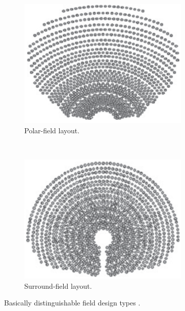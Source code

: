 \begin{figure}[!htbp]
        \centering
        \begin{subfigure}[b]{0.5\textwidth}
                \centering
                \includegraphics[width=0.9\textwidth]{FIG/north_field_layout}
                \caption{Polar-field layout.}\label{north_field_layout}
        \end{subfigure}%
        ~
        \begin{subfigure}[b]{0.5\textwidth}
                \centering
                \includegraphics[width=0.9\textwidth]{FIG/sourround_field_layout}
                \caption{Surround-field layout.}\label{sourround_field_layout}
        \end{subfigure}
        \caption[Basically distinguishable field design types.]{Basically distinguishable field design types \cite{Kulichenko2012}.}\label{Fielddesign}
\end{figure}
